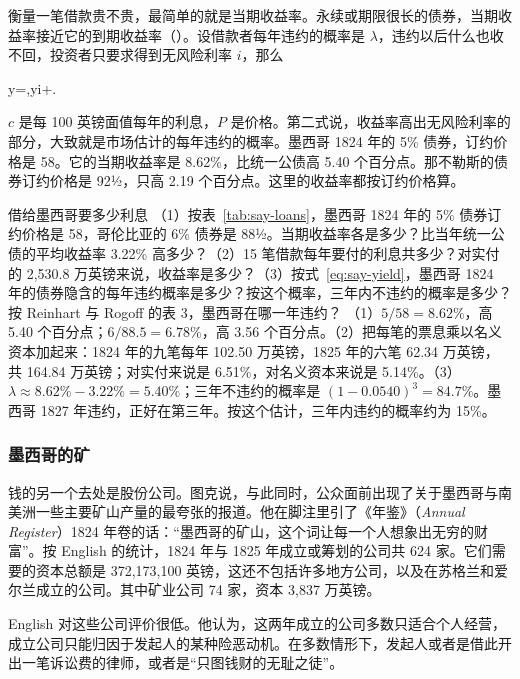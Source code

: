 衡量一笔借款贵不贵，最简单的就是当期收益率。永续或期限很长的债券，当期收益率接近它的到期收益率（）。设借款者每年违约的概率是 $\lambda$，违约以后什么也收不回，投资者只要求得到无风险利率 $i$，那么
\begin{keyeq}
y=,\qquad y\approx i+\lambda .\label{eq:say-yield}
\end{keyeq}
$c$ 是每 100 英镑面值每年的利息，$P$ 是价格。第二式说，收益率高出无风险利率的部分，大致就是市场估计的每年违约的概率。墨西哥 1824 年的 5\% 债券，订约价格是 58。它的当期收益率是 8.62\%，比统一公债高 5.40 个百分点。那不勒斯的债券订约价格是 92½，只高 2.19 个百分点。这里的收益率都按订约价格算。

\begin{example}{借给墨西哥要多少利息}\label{ex:say-yield}
（1）按表~\ref{tab:say-loans}，墨西哥 1824 年的 5\% 债券订约价格是 58，哥伦比亚的 6\% 债券是 88½。当期收益率各是多少？比当年统一公债的平均收益率 3.22\% 高多少？（2）15 笔借款每年要付的利息共多少？对实付的 2,530.8 万英镑来说，收益率是多少？（3）按式~\eqref{eq:say-yield}，墨西哥 1824 年的债券隐含的每年违约概率是多少？按这个概率，三年内不违约的概率是多少？按 Reinhart 与 Rogoff 的表 3，墨西哥在哪一年违约？
\solution （1）$5/58=8.62\%$，高 5.40 个百分点；$6/88.5=6.78\%$，高 3.56 个百分点。（2）把每笔的票息乘以名义资本加起来：1824 年的九笔每年 102.50 万英镑，1825 年的六笔 62.34 万英镑，共 164.84 万英镑；对实付来说是 6.51\%，对名义资本来说是 5.14\%。（3）$\lambda\approx8.62\%-3.22\%=5.40\%$；三年不违约的概率是 $(1-0.0540)^{3}=84.7\%$。墨西哥 1827 年违约，正好在第三年。按这个估计，三年内违约的概率约为 15\%。
\end{example}

\subsubsection{墨西哥的矿}
钱的另一个去处是股份公司。图克说，与此同时，公众面前出现了关于墨西哥与南美洲一些主要矿山产量的最夸张的报道。他在脚注里引了《年鉴》（\emph{Annual Register}）1824 年卷的话：“墨西哥的矿山，这个词让每一个人想象出无穷的财富”\cite{tooke1838v2}。按 English 的统计，1824 年与 1825 年成立或筹划的公司共 624 家。它们需要的资本总额是 372,173,100 英镑，这还不包括许多地方公司，以及在苏格兰和爱尔兰成立的公司。其中矿业公司 74 家，资本 3,837 万英镑\cite{english1827}。

English 对这些公司评价很低。他认为，这两年成立的公司多数只适合个人经营，成立公司只能归因于发起人的某种险恶动机。在多数情形下，发起人或者是借此开出一笔诉讼费的律师，或者是“只图钱财的无耻之徒”\cite{english1827}。

